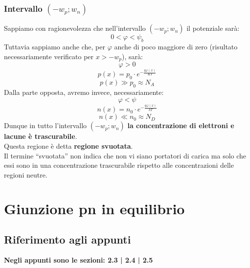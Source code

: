 \documentclass{article}
\numberwithin{equation}{subsection}
\begin{document}
	\subsubsection{Intervallo $(-w_p; w_n)$}
	Sappiamo con ragionevolezza che nell’intervallo $(-w_p; w_n)$ il potenziale sarà:
	$$0 < \varphi < \psi_b$$
	Tuttavia sappiamo anche che, per $\varphi$ anche di poco maggiore di zero (risultato necessariamente verificato per $x > -w_p$), sarà:
	$$\varphi > 0$$
	$$p(x) = p_0 \cdot e^{-\frac{q\varphi(x)}{KT}}$$
	$$p(x) \gg p_0 \approx N_A$$
	Dalla parte opposta, avremo invece, necessariamente:
	$$\varphi < \psi$$
	$$n(x) = n_0 \cdot e^{-\frac{q\varphi(x)}{kT}}$$
	$$n(x) \ll n_0 \approx N_D$$
	Dunque in tutto l’intervallo $(-w_p; w_n)$ \textbf{la concentrazione di elettroni e lacune è trascurabile}. \\
	Questa regione è detta \textbf{regione svuotata}. \\
	Il termine “svuotata” non indica che non vi siano portatori di carica ma solo che essi sono in una concentrazione trascurabile rispetto alle concentrazioni delle regioni neutre.
	\section{Giunzione pn in equilibrio}
	\subsection{Riferimento agli appunti}
	\textbf{Negli appunti sono le sezioni: 2.3 | 2.4 | 2.5}
\end{document}
